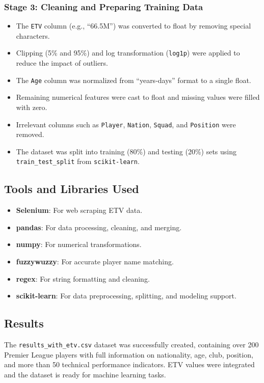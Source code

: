 \documentclass[12pt,a4paper]{article}
\begin{document}
\subsubsection{Stage 3: Cleaning and Preparing Training Data}
\begin{itemize}
    \item The \texttt{ETV} column (e.g., ``66.5M'') was converted to float by removing special characters.
    \item Clipping (5\% and 95\%) and log transformation (\texttt{log1p}) were applied to reduce the impact of outliers.
    \item The \texttt{Age} column was normalized from ``years-days'' format to a single float.
    \item Remaining numerical features were cast to float and missing values were filled with zero.
    \item Irrelevant columns such as \texttt{Player}, \texttt{Nation}, \texttt{Squad}, and \texttt{Position} were removed.
    \item The dataset was split into training (80\%) and testing (20\%) sets using \texttt{train\_test\_split} from \texttt{scikit-learn}.
\end{itemize}

\subsection{Tools and Libraries Used}
\begin{itemize}
    \item \textbf{Selenium}: For web scraping ETV data.
    \item \textbf{pandas}: For data processing, cleaning, and merging.
    \item \textbf{numpy}: For numerical transformations.
    \item \textbf{fuzzywuzzy}: For accurate player name matching.
    \item \textbf{regex}: For string formatting and cleaning.
    \item \textbf{scikit-learn}: For data preprocessing, splitting, and modeling support.
\end{itemize}

\subsection{Results}
The \texttt{results\_with\_etv.csv} dataset was successfully created, containing over 200 Premier League players with full information on nationality, age, club, position, and more than 50 technical performance indicators. ETV values were integrated and the dataset is ready for machine learning tasks.
\end{document}
